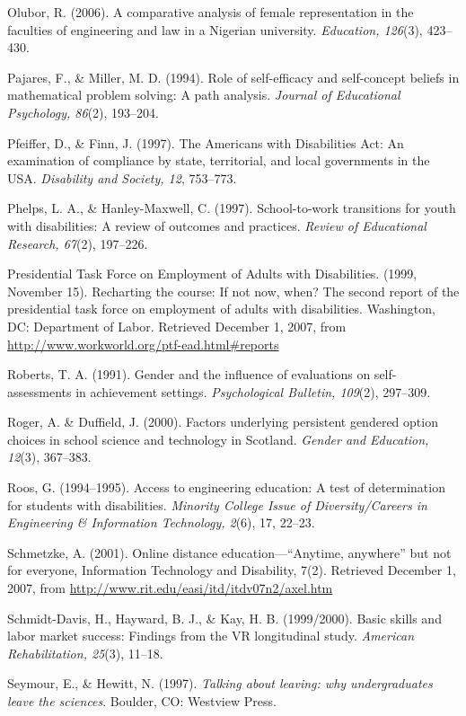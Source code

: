 \documentclass[11.5pt]{sig-alternate} %
\begin{document}
Olubor, R. (2006). A comparative analysis of female representation in the faculties of engineering and law in a Nigerian university. 
\textit{Education, 126}(3), 423–430.  
 
Pajares, F., \& Miller, M. D. (1994). Role of self-efficacy and self-concept beliefs in mathematical problem solving: A path analysis. \textit{Journal of Educational Psychology, 86}(2), 193–204. 
 
Pfeiffer, D., \& Finn, J. (1997). The Americans with Disabilities Act: An examination of compliance by state, territorial, and local governments in the USA. \textit{Disability and Society, 12}, 753–773. 
 
Phelps, L. A., \& Hanley-Maxwell, C. (1997). School-to-work transitions for youth with disabilities: A review of outcomes and practices. \textit{Review of Educational Research, 67}(2), 197–226. 
 
Presidential Task Force on Employment of Adults with Disabilities. (1999, November 15). Recharting the course: If not now, when? The second report of the presidential task force on employment of adults with disabilities. Washington, DC: Department of Labor. Retrieved December 1, 2007, from \url{http://www.workworld.org/ptf-ead.html\#reports}
 
Roberts, T. A. (1991). Gender and the influence of evaluations on self-assessments in achievement settings. \textit{Psychological Bulletin, 109}(2), 297–309. 
 
Roger, A. \& Duffield, J. (2000). Factors underlying persistent gendered option choices in school science and technology in Scotland. 
\textit{Gender and Education, 12}(3), 367–383.  
 
Roos, G. (1994–1995). Access to engineering education: A test of determination for students with disabilities. \textit{Minority College Issue of Diversity/Careers in Engineering \& Information Technology, 2}(6), 17, 22–23. 
 
Schmetzke, A. (2001). Online distance education—“Anytime, anywhere” but not for everyone, Information Technology and Disability, 7(2). Retrieved December 1, 2007, from \url{http://www.rit.edu/easi/itd/itdv07n2/axel.htm} 
 
Schmidt-Davis, H., Hayward, B. J., \& Kay, H. B. (1999/2000). Basic skills and labor market success: Findings from the VR longitudinal study. \textit{American Rehabilitation, 25}(3), 11–18. 
 
Seymour, E., \& Hewitt, N. (1997). \textit{Talking about leaving: why undergraduates leave the sciences}. Boulder, CO: Westview Press.  
 
\end{document}
